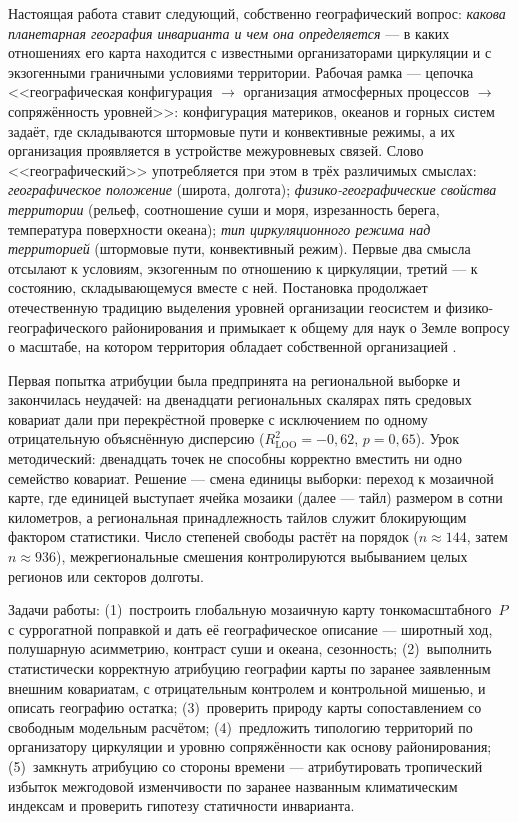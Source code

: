 \documentclass[11pt,a4paper]{article}
\begin{document}
Настоящая работа ставит следующий, собственно географический вопрос: \emph{какова планетарная география инварианта и чем она определяется} --- в каких отношениях его карта находится с известными организаторами циркуляции и с экзогенными граничными условиями территории. Рабочая рамка --- цепочка <<географическая конфигурация $\to$ организация атмосферных процессов $\to$ сопряжённость уровней>>: конфигурация материков, океанов и горных систем задаёт, где складываются штормовые пути и конвективные режимы, а их организация проявляется в устройстве межуровневых связей. Слово <<географический>> употребляется при этом в трёх различимых смыслах: \emph{географическое положение} (широта, долгота); \emph{физико-географические свойства территории} (рельеф, соотношение суши и моря, изрезанность берега, температура поверхности океана); \emph{тип циркуляционного режима над территорией} (штормовые пути, конвективный режим). Первые два смысла отсылают к условиям, экзогенным по отношению к циркуляции, третий --- к состоянию, складывающемуся вместе с ней. Постановка продолжает отечественную традицию выделения уровней организации геосистем и физико-географического районирования \cite{Sochava1978,Isachenko1991,Bertrand1968} и примыкает к общему для наук о Земле вопросу о масштабе, на котором территория обладает собственной организацией \cite{Simon1962,Levin1992,WuLoucks1995}.

Первая попытка атрибуции была предпринята на региональной выборке и закончилась неудачей: на двенадцати региональных скалярах пять средовых ковариат дали при перекрёстной проверке с исключением по одному отрицательную объяснённую дисперсию ($R^2_{\mathrm{LOO}}=-0{,}62$, $p=0{,}65$). Урок методический: двенадцать точек не способны корректно вместить ни одно семейство ковариат. Решение --- смена единицы выборки: переход к мозаичной карте, где единицей выступает ячейка мозаики (далее --- тайл) размером в сотни километров, а региональная принадлежность тайлов служит блокирующим фактором статистики. Число степеней свободы растёт на порядок ($n\approx144$, затем $n\approx936$), межрегиональные смешения контролируются выбыванием целых регионов или секторов долготы.

Задачи работы: (1)~построить глобальную мозаичную карту тонкомасштабного~$P$ с суррогатной поправкой и дать её географическое описание --- широтный ход, полушарную асимметрию, контраст суши и океана, сезонность; (2)~выполнить статистически корректную атрибуцию географии карты по заранее заявленным внешним ковариатам, с отрицательным контролем и контрольной мишенью, и описать географию остатка; (3)~проверить природу карты сопоставлением со свободным модельным расчётом; (4)~предложить типологию территорий по организатору циркуляции и уровню сопряжённости как основу районирования; (5)~замкнуть атрибуцию со стороны времени --- атрибутировать тропический избыток межгодовой изменчивости по заранее названным климатическим индексам и проверить гипотезу статичности инварианта.
\end{document}
